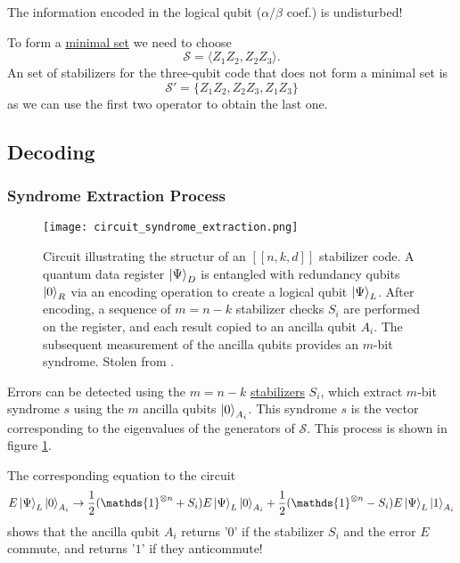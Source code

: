 The information encoded in the logical qubit ($\alpha/\beta$ coef.) is undisturbed!

To form a \hyperref[sec:basic.math.minimal_set]{minimal set} we need to choose
\begin{equation}
    \mathcal{S} = \langle Z_1 Z_2, Z_2 Z_3 \rangle.
\end{equation}
An set of stabilizers for the three-qubit code that does not form a minimal set is
\begin{equation}
    \mathcal{S}' = \{ Z_1 Z_2, Z_2 Z_3, Z_1 Z_3\}
\end{equation}
as we can use the first two operator to obtain the last one. 


\subsection{Decoding}


\subsubsection{Syndrome Extraction Process}\label{sec:basic.qc.syndrome_extraction_process}
\begin{figure}[h]
    \begin{center}
        \texttt{[image: circuit\_syndrome\_extraction.png]}
    \end{center}
    \caption{
        Circuit illustrating the structur of an $[[n,k,d]]$ stabilizer code. 
        A quantum data register $\ket{\Psi}_D$ is entangled with redundancy qubits $\ket{0}_R$ via an encoding operation to create a logical qubit $\ket{\Psi}_L$.
        After encoding, a sequence of $m = n - k$ stabilizer checks $S_i$ are performed on the register, and each result copied to an ancilla qubit $A_i$.         
        The subsequent measurement of the ancilla qubits provides an $m$-bit syndrome.
        Stolen from \cite{QECintro}.
    }
    \label{fig:basic.qc.syndrome_extraction.circuit}
\end{figure}
Errors can be detected using the $m=n-k$ \hyperref[sec:basic.qc.stabilizer]{stabilizers} $S_i$, which extract $m$-bit syndrome $s$ using the $m$ ancilla qubits $\ket{0}_{A_i}$.
This syndrome $s$ is the vector corresponding to the eigenvalues of the generators of $\mathcal{S}$.
This process is shown in figure \ref{fig:basic.qc.syndrome_extraction.circuit}. \cite{QECintro}

The corresponding equation to the circuit
\begin{equation}
    E \ket{\Psi}_L \ket{0}_{A_i} \rightarrow \frac{1}{2} (\mathds{1}^{\otimes n} + S_i) E \ket{\Psi}_L \ket{0}_{A_i} +  \frac{1}{2} (\mathds{1}^{\otimes n} - S_i) E   \ket{\Psi}_L \ket{1}_{A_i} 
\end{equation}
shows that the ancilla qubit $A_i$ returns '$0$' if the stabilizer $S_i$ and the error $E$ commute,
and returns '$1$' if they anticommute! 

